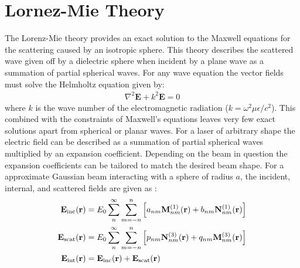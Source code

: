 \section{Lornez-Mie Theory}

The Lorenz-Mie theory provides an exact solution to the Maxwell 
equations for the scattering caused by an isotropic sphere. This 
theory describes the scattered wave given off by a dielectric 
sphere when incident by a plane wave as a summation of partial 
spherical waves. For any wave equation the vector fields must 
solve the Helmholtz equation given by:
\begin{align}
	\nabla^2\mathbf{E} +k^2\mathbf{E} = 0
\end{align} 
where $k$ is the wave number of the electromagnetic radiation 
($k = \omega^2 \mu \epsilon/c^2$). This combined with the constraints of 
Maxwell's equations leaves very few exact solutions apart from 
spherical or planar waves. For a laser of arbitrary shape the 
electric field can be described as a summation of partial 
spherical waves multiplied by an expansion coefficient. Depending 
on the beam in question the expansion coefficients can be tailored
to match the desired beam shape. For a approximate Gaussian beam 
interacting with a sphere of radius $a$, the incident, internal, 
and scattered fields are given as \cite{RanhaNeves2019}: 
\begin{align}
	\label{eq:incident}
	{\bf E}_{\rm inc}({\bf r})
	&=
	E_0 \sum_{n}^\infty\sum_{m=-n}^n \left[
	a_{nm}{\bf M}_{nm}^{(1)}({\bf r})
	+ b_{nm}{\bf N}_{nm}^{(1)}({\bf r})\right]
	\\
	\label{eq:scattered}
	{\bf E}_{\rm scat}({\bf r})
	&=
	E_0 \sum_{n}^\infty \sum_{m=-n}^n\left[
	p_{nm}{\bf N}_{nm}^{(3)}({\bf r})+q_{nm}{\bf M}_{nm}^{(3)}({\bf r})
	\right] 
	\\
	\label{eq:internal}
	{\bf E}_{\rm int}({\bf r})
	&=
	{\bf E}_{\rm inc}({\bf r}) + {\bf E}_{\rm scat}({\bf r})
\end{align}

